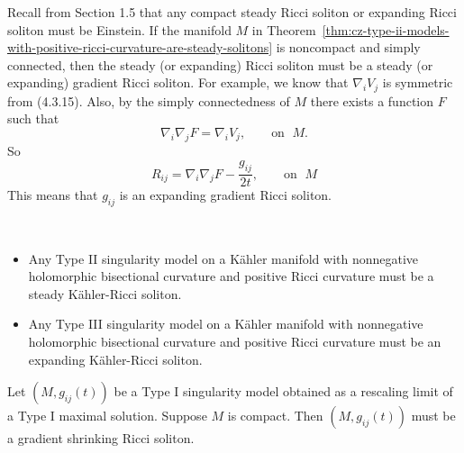 \begin{remark}
  \label{rem:cz-noncompact-type-ii-models-and-steady-solitons}
Recall from Section 1.5 that any compact steady Ricci soliton or
expanding Ricci soliton must be Einstein. If the manifold $M$ in
Theorem~\ref{thm:cz-type-ii-models-with-positive-ricci-curvature-are-steady-solitons} is noncompact and simply connected, then the steady
(or expanding) Ricci soliton must be a steady (or expanding)
gradient Ricci soliton. For example, we know that $\nabla_iV_j$ is
symmetric from (4.3.15).  Also, by the simply connectedness of $M$
there exists a function $F$ such that
$$
\nabla_i\nabla_jF=\nabla_iV_j,\qquad \text{on }\;M.
$$
So
$$
R_{ij}=\nabla_i\nabla_jF-\frac{g_{ij}}{2t},\qquad \text{on }\;M
$$
This means that $g_{ij}$ is an expanding gradient Ricci soliton.
\end{remark}
\begin{theorem}
  \label{thm:cz-kahler-type-ii-models-are-steady-solitons}
 \
\begin{itemize}
\item[(i)] Any Type {\rm II} singularity model on a K\"ahler
manifold with nonnegative holomorphic bisectional curvature and
positive Ricci curvature must be a steady K\"ahler-Ricci soliton.
\item[(ii)] Any Type {\rm III} singularity model on a K\"ahler
manifold with nonnegative holomorphic bisectional curvature and
positive Ricci curvature must be an expanding K\"ahler-Ricci
soliton.
\end{itemize}
\end{theorem}
\begin{theorem}
  \label{thm:cz-compact-type-i-limits-are-shrinking-solitons}
Let $(M,g_{ij}(t))$ be a Type {\rm I} singularity model obtained
as a rescaling limit of a Type {\rm I} maximal solution. Suppose
$M$ is compact. Then $(M,g_{ij}(t))$ must be a gradient shrinking
Ricci soliton.
\end{theorem}
